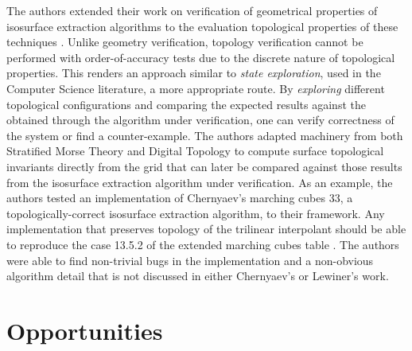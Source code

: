 The authors extended their work on verification of geometrical properties of
isosurface extraction algorithms to the evaluation topological properties of these
techniques \cite{Etiene:2012:TVI:2197070.2197097}. Unlike geometry verification, topology
verification cannot be performed with order-of-accuracy tests due to
the discrete nature of topological properties. This renders an
approach similar to
\emph{state exploration}, used in the Computer Science literature,  
a more appropriate route. By \emph{exploring} different topological
configurations and comparing the expected results against the obtained
through the algorithm under verification, one can verify correctness of
the system or find a counter-example.
%
The authors adapted machinery from both Stratified Morse
Theory\cite{Goresky:1988:SMT} and Digital Topology\cite{siqueira:2007}
to compute surface topological invariants directly from the grid that can later be
compared against those results from the isosurface extraction algorithm
under verification.  As an example, the authors tested an
implementation of Chernyaev's marching cubes
33\cite{Chernyaev95marchingcubes}, a topologically-correct isosurface extraction algorithm,
to their framework. Any implementation
that preserves topology of the trilinear interpolant should be able
to reproduce the case 13.5.2 of the extended marching cubes
table \cite{lopes:tvcg:2003}. The authors  were able to find non-trivial bugs in the
implementation and a non-obvious algorithm detail that is not
discussed in either Chernyaev's or Lewiner's work. 

\section{Opportunities}
\label{sec:opportunities}

